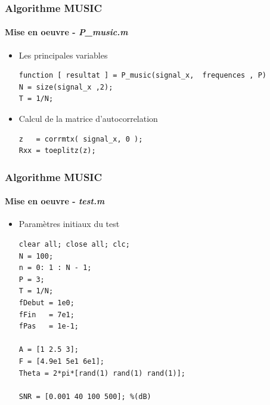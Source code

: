 \documentclass[10pt]{beamer}
\begin{document}

\begin{frame}[fragile]
%
\frametitle{Algorithme MUSIC}
\framesubtitle{Mise en oeuvre - \textit{P\_music.m}}
%
%
\begin{itemize}
  \item  Les principales variables
  
  \begin{lstlisting}
function [ resultat ] = P_music(signal_x,  frequences , P)
N = size(signal_x ,2);
T = 1/N;
\end{lstlisting}
%
\item  Calcul de la matrice d'autocorrelation

\begin{lstlisting}
z   = corrmtx( signal_x, 0 );
Rxx = toeplitz(z);
\end{lstlisting}

\end{itemize}
\end{frame}



\begin{frame}[fragile]
%
\frametitle{Algorithme MUSIC}
\framesubtitle{Mise en oeuvre - \textit{test.m}}
%
%
\begin{itemize}
  
  \item Paramètres initiaux du test
  
  \begin{lstlisting}
clear all; close all; clc;
N = 100;
n = 0: 1 : N - 1;
P = 3;
T = 1/N;
fDebut = 1e0;
fFin   = 7e1;
fPas   = 1e-1;

A = [1 2.5 3];
F = [4.9e1 5e1 6e1];
Theta = 2*pi*[rand(1) rand(1) rand(1)];

SNR = [0.001 40 100 500]; %(dB)

\end{lstlisting}

\end{itemize}
\end{frame}


\end{document}
